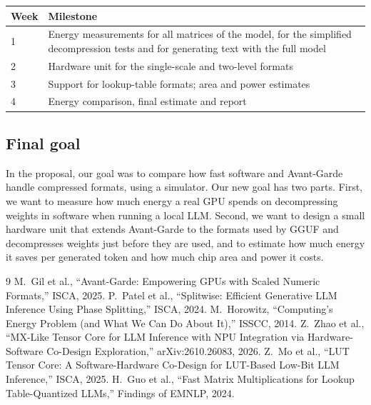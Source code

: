 \documentclass[10pt,twocolumn,letterpaper]{article}
\begin{document}
\vspace{2pt}\noindent\begin{minipage}{\columnwidth}
\begin{center}\small
{}
\label{tab:milestones}
\begin{tabular}{@{}lp{}@{}}
\toprule
Week & Milestone\\
\midrule
1 & Energy measurements for all matrices of the model, for the simplified decompression tests and for generating text with the full model\\
2 & Hardware unit for the single-scale and two-level formats\\
3 & Support for lookup-table formats; area and power estimates\\
4 & Energy comparison, final estimate and report\\
\bottomrule
\end{tabular}
\end{center}
\end{minipage}

\subsection{Final goal}
In the proposal, our goal was to compare how fast software and Avant-Garde handle compressed formats, using a
simulator. Our new goal has two parts. First, we want to measure how much energy a real GPU spends on decompressing
weights in software when running a local LLM. Second, we want to design a small hardware unit that extends
Avant-Garde to the formats used by GGUF and decompresses weights just before they are used, and to estimate how much
energy it saves per generated token and how much chip area and power it costs.

{\footnotesize
\begin{thebibliography}{9}\setlength{\itemsep}{0pt}
 M.~Gil et al., ``Avant-Garde: Empowering GPUs with Scaled Numeric Formats,'' ISCA, 2025.
 P.~Patel et al., ``Splitwise: Efficient Generative LLM Inference Using Phase Splitting,'' ISCA, 2024.
 M.~Horowitz, ``Computing's Energy Problem (and What We Can Do About It),'' ISSCC, 2014.
 Z.~Zhao et al., ``MX-Like Tensor Core for LLM Inference with NPU Integration via Hardware-Software Co-Design Exploration,'' arXiv:2610.26083, 2026.
 Z.~Mo et al., ``LUT Tensor Core: A Software-Hardware Co-Design for LUT-Based Low-Bit LLM Inference,'' ISCA, 2025.
 H.~Guo et al., ``Fast Matrix Multiplications for Lookup Table-Quantized LLMs,'' Findings of EMNLP, 2024.
\end{thebibliography}}
\end{document}
